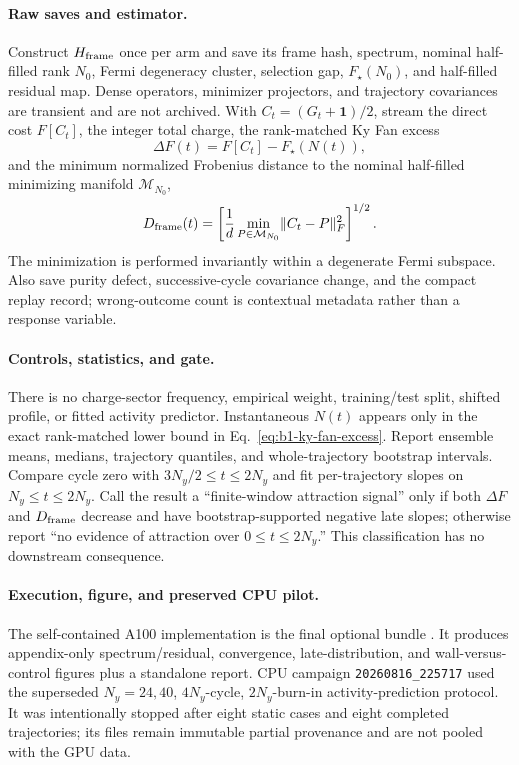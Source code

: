 \documentclass[aps,prx,twocolumn,floatfix,nofootinbib,superscriptaddress,longbibliography]{revtex4-2}
\newcommand{\code}[1]{\texttt{#1}}
\begin{document}
\paragraph*{Raw saves and estimator.}
Construct $H_{\rm frame}$ once per arm and save its frame hash, spectrum, nominal
half-filled rank $N_0$, Fermi degeneracy cluster, selection gap, $F_\star(N_0)$, and
half-filled residual map.  Dense operators, minimizer projectors, and trajectory
covariances are transient and are not archived.  With
$C_t=(G_t+\mathbf{1})/2$, stream the direct cost $F[C_t]$, the integer total charge,
the rank-matched Ky Fan excess
\begin{equation}
 \Delta F(t)=F[C_t]-F_\star(N(t)),
 \label{eq:b1-ky-fan-excess}
\end{equation}
and the minimum normalized Frobenius distance to the nominal half-filled minimizing
manifold $\mathcal M_{N_0}$,
\begin{equation}
 D_{\rm frame}(t)=
 \left[\frac{1}{d}\min_{P\in\mathcal M_{N_0}}\lVert C_t-P\rVert_F^2\right]^{1/2}.
 \label{eq:b1-manifold-distance}
\end{equation}
The minimization is performed invariantly within a degenerate Fermi subspace.  Also save
purity defect, successive-cycle covariance change, and the compact replay record;
wrong-outcome count is contextual metadata rather than a response variable.

\paragraph*{Controls, statistics, and gate.}
There is no charge-sector frequency, empirical weight, training/test split, shifted
profile, or fitted activity predictor.  Instantaneous $N(t)$ appears only in the exact
rank-matched lower bound in Eq.~\eqref{eq:b1-ky-fan-excess}.  Report ensemble means,
medians, trajectory quantiles, and whole-trajectory bootstrap intervals.  Compare cycle
zero with $3N_y/2\leq t\leq2N_y$ and fit per-trajectory slopes on
$N_y\leq t\leq2N_y$.  Call the result a ``finite-window attraction signal'' only if both
$\Delta F$ and $D_{\rm frame}$ decrease and have bootstrap-supported negative late slopes;
otherwise report ``no evidence of attraction over $0\leq t\leq2N_y$.''  This
classification has no downstream consequence.

\paragraph*{Execution, figure, and preserved CPU pilot.}
The self-contained A100 implementation is the final optional bundle
.
It produces appendix-only spectrum/residual, convergence, late-distribution, and
wall-versus-control figures plus a standalone report.  CPU campaign
\code{20260816\_225717} used the superseded $N_y=24,40$, $4N_y$-cycle, $2N_y$-burn-in
activity-prediction protocol.  It was intentionally stopped after eight static cases and
eight completed trajectories; its files remain immutable partial provenance and are not
pooled with the GPU data.
\end{document}
